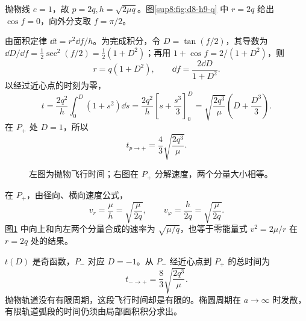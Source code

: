 \begin{solution}
抛物线 $e=1$，故 $p=2q,h=\sqrt{2\mu q}$。图\ref{sup8:fig:d8-h9-q} 中 $r=2q$ 给出 $\cos f=0$，向外分支取 $f=\pi/2$。

由面积定律 $\dd t=r^2\dd f/h$。为完成积分，令 $D=\tan(f/2)$，其导数为 $\dd D/\dd f=\tfrac12\sec^2(f/2)=\tfrac12(1+D^2)$；再用 $1+\cos f=2/(1+D^2)$，则
\[
 r=q(1+D^2),\qquad \dd f=\frac{2\dd D}{1+D^2}.
\]
以经过近心点的时刻为零，
\[
 t=\frac{2q^2}h\int_0^D(1+s^2)\dd s
 =\frac{2q^2}h\left[s+\frac{s^3}3\right]_0^D
 =\sqrt{\frac{2q^3}\mu}\left(D+\frac{D^3}3\right).
\]
在 $P_+$ 处 $D=1$，所以
\[
 \boxed{t_{p\to+}=\frac43\sqrt{\frac{2q^3}\mu}}.
\]
\begin{figure}[H]\centering
{}
\caption{左图为抛物飞行时间；右图在 $P_+$ 分解速度，两个分量大小相等。}\label{sup8:fig:d8-h9-s}
\end{figure}
在 $P_+$，由径向、横向速度公式，
\[
 v_r=\frac\mu h=\sqrt{\frac\mu{2q}},\qquad
 v_\varphi=\frac h{2q}=\sqrt{\frac\mu{2q}}.
\]
图\ref{sup8:fig:d8-h9-s} 中向上和向左两个分量合成的速率为 $\sqrt{\mu/q}$，也等于零能量式 $v^2=2\mu/r$ 在 $r=2q$ 处的结果。

$t(D)$ 是奇函数，$P_-$ 对应 $D=-1$。从 $P_-$ 经近心点到 $P_+$ 的总时间为
\[
 \boxed{t_{-\to+}=\frac83\sqrt{\frac{2q^3}\mu}}.
\]
抛物轨道没有有限周期，这段飞行时间却是有限的。椭圆周期在 $a\to\infty$ 时发散，有限轨道弧段的时间仍须由局部面积积分求出。
\end{solution}


